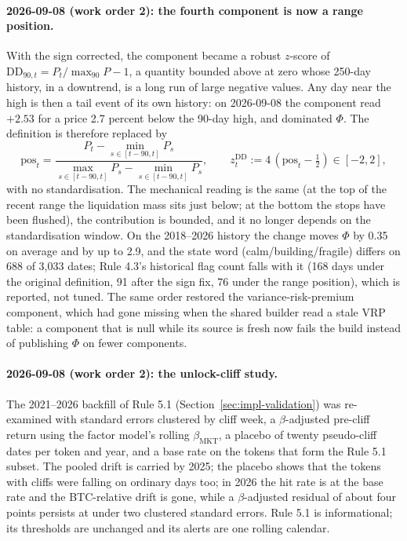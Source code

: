 \documentclass[11pt,a4paper]{article}
\theoremstyle{definition}
\begin{document}
\paragraph{2026-09-08 (work order 2): the fourth component is now a range position.} With the sign corrected, the component became a robust $z$-score of $\mathrm{DD}_{90,t} = P_t/\max_{90} P - 1$, a quantity bounded above at zero whose 250-day history, in a downtrend, is a long run of large negative values. Any day near the high is then a tail event of its own history: on 2026-09-08 the component read $+2.53$ for a price 2.7 percent below the 90-day high, and dominated $\Phi$. The definition is therefore replaced by
\[
\mathrm{pos}_t = \frac{P_t - \min_{s\in[t-90,t]} P_s}{\max_{s\in[t-90,t]} P_s - \min_{s\in[t-90,t]} P_s}, \qquad z^{\mathrm{DD}}_t := 4\,(\mathrm{pos}_t - \tfrac12) \in [-2, 2],
\]
with no standardisation. The mechanical reading is the same (at the top of the recent range the liquidation mass sits just below; at the bottom the stops have been flushed), the contribution is bounded, and it no longer depends on the standardisation window. On the 2018--2026 history the change moves $\Phi$ by 0.35 on average and by up to 2.9, and the state word (calm/building/fragile) differs on 688 of 3,033 dates; Rule 4.3's historical flag count falls with it (168 days under the original definition, 91 after the sign fix, 76 under the range position), which is reported, not tuned. The same order restored the variance-risk-premium component, which had gone missing when the shared builder read a stale VRP table: a component that is null while its source is fresh now fails the build instead of publishing $\Phi$ on fewer components.

\paragraph{2026-09-08 (work order 2): the unlock-cliff study.} The 2021--2026 backfill of Rule 5.1 (Section~\ref{sec:impl-validation}) was re-examined with standard errors clustered by cliff week, a $\beta$-adjusted pre-cliff return using the factor model's rolling $\beta_{\mathrm{MKT}}$, a placebo of twenty pseudo-cliff dates per token and year, and a base rate on the tokens that form the Rule 5.1 subset. The pooled drift is carried by 2025; the placebo shows that the tokens with cliffs were falling on ordinary days too; in 2026 the hit rate is at the base rate and the BTC-relative drift is gone, while a $\beta$-adjusted residual of about four points persists at under two clustered standard errors. Rule 5.1 is informational; its thresholds are unchanged and its alerts are one rolling calendar.
\end{document}
